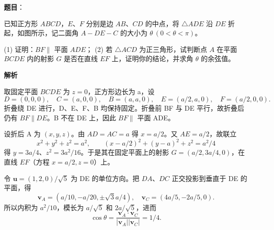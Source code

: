 \begin{answer}

\textbf{题目}：

已知正方形 $ABCD$，$E\text{、}F$ 分别是边 $AB\text{、}CD$ 的中点，将 $\triangle ADE$ 沿 $DE$ 折起，如图所示，记二面角 $A-DE-C$ 的大小为 $\theta\ (0<\theta<\pi)$。

(1) 证明：$BF\parallel$ 平面 $ADE$；
(2) 若 $\triangle ACD$ 为正三角形，试判断点 $A$ 在平面 $BCDE$ 内的射影 $G$ 是否在直线 $EF$ 上，证明你的结论，并求角 $\theta$ 的余弦值。
\nopagebreak[4]
\begin{center}\end{center}
\nopagebreak[4]
\textbf{解析}


取固定平面 $BCDE$ 为 $z=0$，正方形边长为 a，设
\nopagebreak[4]
\[
D=(0,0,0),\quad C=(a,0,0),\quad B=(a,a,0),\quad
E=(a/2,a,0),\quad F=(a/2,0,0).
\]
折叠绕 DE 进行，D、E、F、B 均保持固定。折叠前 BF 与 DE 平行，故折叠后仍有 $BF\parallel DE$。B 不在 DE 上，因此 $BF\parallel$ 平面 ADE。


设折后 A 为 $(x,y,z)$。由 $AD=AC=a$ 得 $x=a/2$。又 $AE=a/2$，故联立
\nopagebreak[4]
\[
x^2+y^2+z^2=a^2,\qquad
(x-a/2)^2+(y-a)^2+z^2=a^2/4
\]
得 $y=3a/4$、$z^2=3a^2/16$。于是其在固定平面上的射影
$G=(a/2,3a/4,0)$，在直线 $EF$（方程 $x=a/2,z=0$）上。

令 $\mathbf u=(1,2,0)/\sqrt5$ 为 DE 的单位方向。把 $DA$、$DC$ 正交投影到垂直于 DE 的平面，得
\nopagebreak[4]
\[
\mathbf v_A=(a/10,-a/20,\pm\sqrt3a/4),\quad
\mathbf v_C=(4a/5,-2a/5,0).
\]
所以内积为 $a^2/10$，模长为 $a/\sqrt5$ 和 $2a/\sqrt5$，进而
\nopagebreak[4]
\[
\cos\theta=\frac{\mathbf v_A\cdot\mathbf v_C}{|\mathbf v_A||\mathbf v_C|}=1/4.
\]
\nopagebreak[4]
\begin{center}\end{center}
\nopagebreak[4]


\end{answer}
